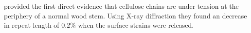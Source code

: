 \cite{Clair_2006} provided the first direct evidence that cellulose chains are under tension at the periphery of a normal wood stem. Using X-ray diffraction they found an decrease in repeat length of 0.2\% when the surface strains were released. 
